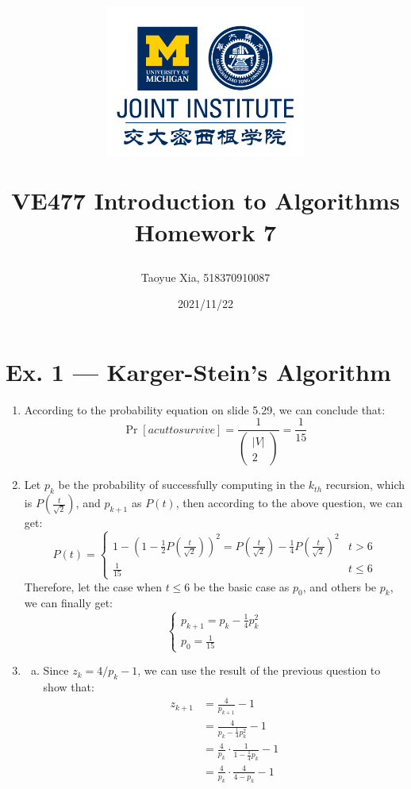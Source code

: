 \documentclass[12pt, a4paper]{article}
\title{
    \begin{figure}[H]
        \centering
        \includegraphics[width=7cm, height=5cm]{AAA.png}
    \end{figure}
    VE477 Introduction to Algorithms\\ 
    Homework 7}
\author{Taoyue Xia, 518370910087}
\date{2021/11/22}
\begin{document}
\maketitle

\newpage

\section*{Ex. 1 --- Karger-Stein’s Algorithm}
\begin{enumerate}
    \item According to the probability equation on slide 5.29, we can conclude that:
          \[\Pr[a cut to survive] = \frac{1}{\begin{pmatrix} |V|\\ 2\end{pmatrix}} = \frac{1}{15}\]
    \item Let $p_k$ be the probability of successfully computing in the $k_{th}$ recursion, which is $P(\frac{t}{\sqrt{2}})$, and $p_{k+1}$ as $P(t)$, then according to the above question, we can get:
          \[P(t) =
          \begin{cases}
             1 - (1 - \frac{1}{2}P(\frac{t}{\sqrt{2}}))^2 = P(\frac{t}{\sqrt{2}}) - \frac{1}{4} P(\frac{t}{\sqrt{2}})^2& t > 6\\
             \frac{1}{15} & t \leq 6
          \end{cases}
          \]
          Therefore, let the case when $t \leq 6$ be the basic case as $p_0$, and others be $p_k$, we can finally get:
          \[
            \begin{cases}
                p_{k+1} = p_k - \frac{1}{4}p_k^2\\
                p_0 = \frac{1}{15}
            \end{cases}
          \]
    \item \begin{enumerate}[a)]
        \item Since $z_k = 4 / p_k - 1$, we can use the result of the previous question to show that:
              \begin{align*}
                  z_{k+1} &= \frac{4}{p_{k+1}} - 1\\
                          &= \frac{4}{p_k - \frac{1}{4}p_k^2} - 1\\
                          &= \frac{4}{p_k}\cdot \frac{1}{1 - \frac{1}{4}p_k} - 1\\
                          &= \frac{4}{p_k}\cdot \frac{4}{4 - p_k} - 1\\

\end{align*}
\end{enumerate}
\end{enumerate}
\end{document}
